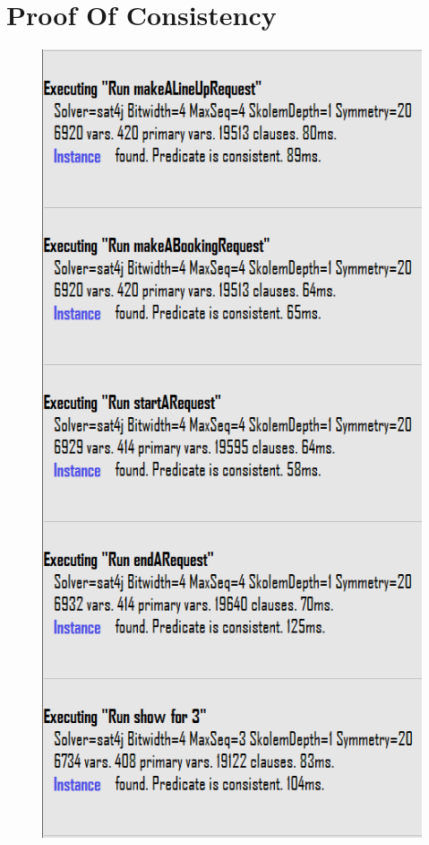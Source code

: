 \section{Proof Of Consistency}

 \begin{figure}[H]
\includegraphics[scale=0.8]{./Images/ScreenAlloy/ProofOfConsistency}
\end{figure}

